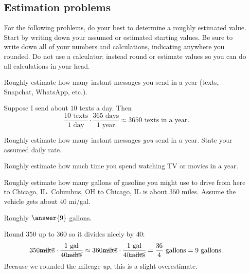 \documentclass[12pt]{ximera}
\begin{document}
\subsection*{Estimation problems}

For the following problems, do your best to determine a roughly estimated value.
Start by writing down your assumed or estimated starting values. Be sure to write
down all of your numbers and calculations, indicating anywhere you rounded. Do not
use a calculator; instead round or estimate values so you can do all calculations in
your head.

\begin{example}
Roughly estimate how many instant messages you send in a year (texts, Snapchat,
WhatsApp, etc.).

Suppose I send about $10$ texts a day. Then
\[
\frac{10 \text{ texts}}{1 \text{ day}} \cdot \frac{365 \text{ days}}{1 \text{ year}}
\approx 3650 \text{ texts in a year}.
\]
\end{example}

\begin{problem}
Roughly estimate how many instant messages \emph{you} send in a year. State your
assumed daily rate.

\begin{freeResponse}
\end{freeResponse}
\end{problem}

\begin{problem}
Roughly estimate how much time you spend watching TV or movies in a year.

\begin{freeResponse}
\end{freeResponse}
\end{problem}

\begin{problem}
Roughly estimate how many gallons of gasoline you might use to drive from here to
Chicago, IL. Columbus, OH to Chicago, IL is about $350$ miles. Assume the vehicle
gets about $40$ mi/gal.

Roughly $\answer{9}$ gallons.

\begin{solution}
Round $350$ up to $360$ so it divides nicely by $40$:
\[
350 \cancel{\text{miles}} \cdot \frac{1 \text{ gal}}{40 \cancel{\text{miles}}}
\approx 360 \cancel{\text{miles}} \cdot \frac{1 \text{ gal}}{40 \cancel{\text{miles}}}
= \frac{36}{4} \text{ gallons} = 9 \text{ gallons}.
\]
Because we rounded the mileage \emph{up}, this is a slight overestimate.
\end{solution}
\end{problem}
\end{document}
